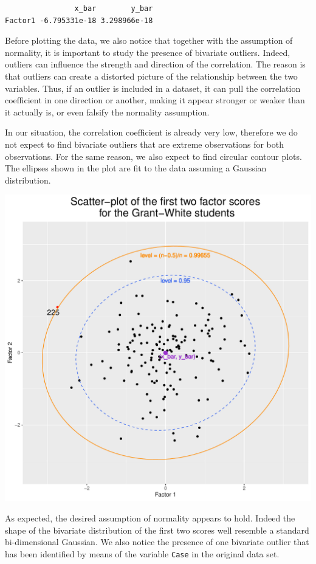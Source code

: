 \documentclass[
  letterpaper,
  DIV=11,
  numbers=noendperiod]{scrartcl}
\begin{document}
\begin{verbatim}
                x_bar        y_bar
Factor1 -6.795331e-18 3.298966e-18
\end{verbatim}

Before plotting the data, we also notice that together with the
assumption of normality, it is important to study the presence of
bivariate outliers. Indeed, outliers can influence the strength and
direction of the correlation. The reason is that outliers can create a
distorted picture of the relationship between the two variables. Thus,
if an outlier is included in a dataset, it can pull the correlation
coefficient in one direction or another, making it appear stronger or
weaker than it actually is, or even falsify the normality assumption.

In our situation, the correlation coefficient is already very low,
therefore we do not expect to find bivariate outliers that are extreme
observations for both observations. For the same reason, we also expect
to find circular contour plots. The ellipses shown in the plot are fit
to the data assuming a Gaussian distribution.

\includegraphics{ProblemSet2_files/figure-pdf/unnamed-chunk-38-1.pdf}

As expected, the desired assumption of normality appears to hold. Indeed
the shape of the bivariate distribution of the first two scores well
resemble a standard bi-dimensional Gaussian. We also notice the presence
of one bivariate outlier that has been identified by means of the
variable \texttt{Case} in the original data set.
\end{document}
